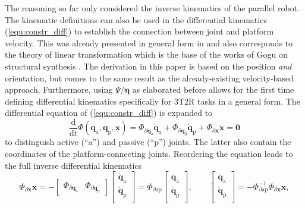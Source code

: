 \documentclass[robotics,article,accept,moreauthors,pdftex]{Definitions/mdpi}
\newcommand{\bm}[1]{\boldsymbol{#1}}
\let\Phi\varPhi
\let\Psi\varPsi
\begin{document}
The reasoning so far only considered the inverse kinematics of the parallel robot.
The kinematic definitions can also be used in the differential kinematics (\ref{equ:constr_diff}) to establish the connection between joint and platform velocity.
This was already presented in general form in \cite{Merlet2006} and also corresponds to the theory of linear transformation which is the base of the works of Gogu on structural synthesis \cite{Gogu2008}.
The derivation in this paper is based on the position \emph{and} orientation, but comes to the same result as the already-existing velocity-based approach.
Furthermore, using $\bm{\Psi}$/$\bm{\eta}$ as elaborated before allows for the first time defining differential kinematics specifically for 3T2R tasks in a general form.
The differential equation of (\ref{equ:constr_diff}) is expanded to 
\begin{equation}
\frac{\mathrm{d}}{\mathrm{d}t} \bm{\Phi}(\bm{q}_{\mathrm{a}}, \bm{q}_{\mathrm{p}},\bm{x})
=
\bm{\Phi}_{\partial\bm{q}_{\mathrm{a}}} \dot{\bm{q}}_{\mathrm{a}} + \bm{\Phi}_{\partial\bm{q}_{\mathrm{p}}} \dot{\bm{q}}_{\mathrm{p}} + \bm{\Phi}_{\partial\bm{x}} \dot{\bm{x}} 
=
\bm{0}
\label{equ:constr_diff_qap}
\end{equation}
to distinguish active (``a'') and passive (``p'') joints.
The latter also contain the coordinates of the platform-connecting joints.
Reordering the equation leads to the full inverse differential kinematics
\begin{equation}
\bm{\Phi}_{\partial\bm{x}} \dot{\bm{x}}
=
- 
\begin{bmatrix} \bm{\Phi}_{\partial\bm{q}_{\mathrm{a}}} & \bm{\Phi}_{\partial\bm{q}_{\mathrm{p}}}\end{bmatrix}
\begin{bmatrix}
\dot{\bm{q}}_{\mathrm{a}} \\
\dot{\bm{q}}_{\mathrm{p}} \\
\end{bmatrix}
=
\bm{\Phi}_{\partial\mathrm{ap}}
\begin{bmatrix}
\dot{\bm{q}}_{\mathrm{a}} \\
\dot{\bm{q}}_{\mathrm{p}} \\
\end{bmatrix},
\quad\quad
\begin{bmatrix}
\dot{\bm{q}}_{\mathrm{a}} \\
\dot{\bm{q}}_{\mathrm{p}} \\
\end{bmatrix}
=
-\bm{\Phi}_{\partial\mathrm{ap}}^{-1} \bm{\Phi}_{\partial\bm{x}}
\dot{\bm{x}},
\label{equ:full_diff_ik}
\end{equation}
\end{document}
